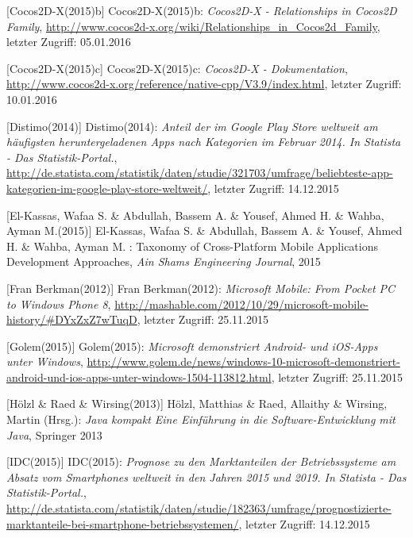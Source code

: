 \begin{thebibliography}{}
[Cocos2D-X(2015)b] Cocos2D-X(2015)b: \emph{Cocos2D-X - Relationships in Cocos2D Family},
\url{http://www.cocos2d-x.org/wiki/Relationships_in_Cocos2d_Family}, letzter Zugriff: 05.01.2016

[Cocos2D-X(2015)c] Cocos2D-X(2015)c: \emph{Cocos2D-X - Dokumentation},
\url{http://www.cocos2d-x.org/reference/native-cpp/V3.9/index.html}, letzter Zugriff: 10.01.2016

[Distimo(2014)] Distimo(2014): \emph{Anteil der im Google Play Store weltweit am häufigsten heruntergeladenen Apps nach Kategorien im Februar 2014. In Statista - Das Statistik-Portal.},
\url{http://de.statista.com/statistik/daten/studie/321703/umfrage/beliebteste-app-kategorien-im-google-play-store-weltweit/}, letzter Zugriff: 14.12.2015

[El-Kassas, Wafaa S. \& Abdullah, Bassem A. \&  Yousef, Ahmed H. \&  Wahba, Ayman M.(2015)] El-Kassas, Wafaa S. \& Abdullah, Bassem A. \&  Yousef, Ahmed H. \&  Wahba, Ayman M. :
\glqq Taxonomy of Cross-Platform Mobile Applications Development Approaches\grqq, 
\emph{Ain Shams Engineering Journal}, 2015

[Fran Berkman(2012)] Fran Berkman(2012): \emph{Microsoft Mobile: From Pocket PC to Windows Phone 8},
\url{http://mashable.com/2012/10/29/microsoft-mobile-history/#DYxZxZ7wTuqD}, letzter Zugriff: 25.11.2015

[Golem(2015)] Golem(2015): \emph{Microsoft demonstriert Android- und iOS-Apps unter Windows},
\url{http://www.golem.de/news/windows-10-microsoft-demonstriert-android-und-ios-apps-unter-windows-1504-113812.html}, letzter Zugriff: 25.11.2015

[Hölzl \& Raed \& Wirsing(2013)] Hölzl, Matthias \& Raed, Allaithy \& Wirsing, Martin (Hrsg.): 
\emph{Java kompakt Eine Einführung in die Software-Entwicklung
	mit Java}, Springer 2013

[IDC(2015)] IDC(2015): \emph{Prognose zu den Marktanteilen der Betriebssysteme am Absatz vom Smartphones weltweit in den Jahren 2015 und 2019. In Statista - Das Statistik-Portal.},
\url{http://de.statista.com/statistik/daten/studie/182363/umfrage/prognostizierte-marktanteile-bei-smartphone-betriebssystemen/}, letzter Zugriff: 14.12.2015


\end{thebibliography}
